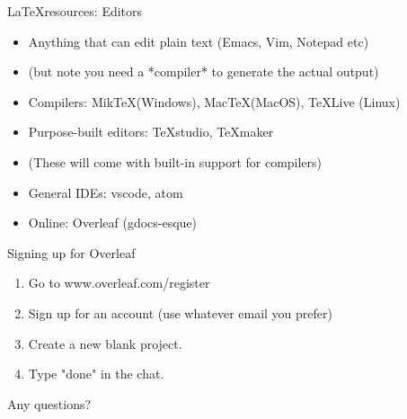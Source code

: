 \documentclass{beamer}
\begin{document}
\begin{frame}{\LaTeX resources: Editors}
\begin{itemize}
	\item Anything that can edit plain text (Emacs, Vim, Notepad etc)
	\item (but note you need a *compiler* to generate the actual output)
	\item Compilers: Mik\TeX (Windows), Mac\TeX (MacOS), \TeX Live (Linux)
	\pause
	\item Purpose-built editors: \TeX{studio}, \TeX{maker}
	\item (These will come with built-in support for compilers)
	\pause
	\item General IDEs: vscode, atom
	\pause
	\item Online: Overleaf (gdocs-esque)
\end{itemize}

\end{frame}

\begin{frame}{Signing up for Overleaf}
	\begin{enumerate}
		\item Go to www.overleaf.com/register
		\item Sign up for an account (use whatever email you prefer)
		\item Create a new blank project.
		\item Type "done" in the chat.
	\end{enumerate}
\end{frame}


\begin{frame}
	Any questions?
\end{frame}
\end{document}
